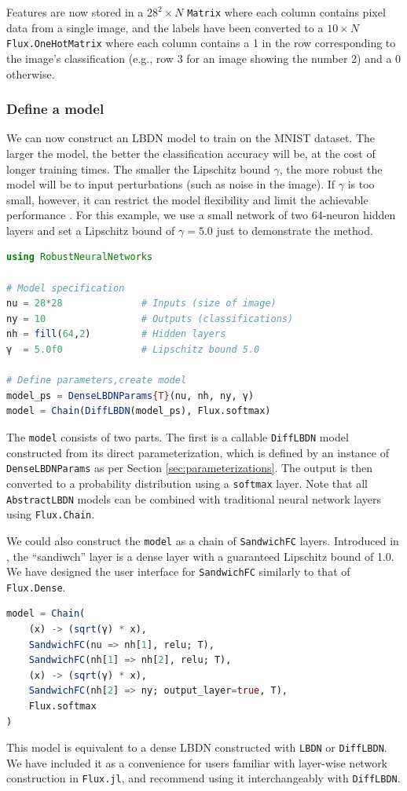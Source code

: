 Features are now stored in a $28^2\times N$ \verb|Matrix| where each column contains pixel data from a single image, and the labels have been converted to a $10\times N$ \verb|Flux.OneHotMatrix| where each column contains a 1 in the row corresponding to the image's classification (e.g., row 3 for an image showing the number 2) and a 0 otherwise.

\subsubsection{Define a model} \label{sec:mnist-model}

We can now construct an LBDN model to train on the MNIST dataset. The larger the model, the better the classification accuracy will be, at the cost of longer training times. The smaller the Lipschitz bound $\gamma$, the more robust the model will be to input perturbations (such as noise in the image). If $\gamma$ is too small, however, it can restrict the model flexibility and limit the achievable performance \cite{Wang+Manchester2023}. For this example, we use a small network of two 64-neuron hidden layers and set a Lipschitz bound of $\gamma=5.0$ just to demonstrate the method.

\begin{lstlisting}[language = Julia]
using RobustNeuralNetworks

# Model specification
nu = 28*28              # Inputs (size of image)
ny = 10                 # Outputs (classifications)
nh = fill(64,2)         # Hidden layers 
γ  = 5.0f0              # Lipschitz bound 5.0

# Define parameters,create model
model_ps = DenseLBDNParams{T}(nu, nh, ny, γ)
model = Chain(DiffLBDN(model_ps), Flux.softmax)
\end{lstlisting}

The \verb|model| consists of two parts. The first is a callable \verb|DiffLBDN| model constructed from its direct parameterization, which is defined by an instance of \verb|DenseLBDNParams| as per Section \ref{sec:parameterizations}. The output is then converted to a probability distribution using a \verb|softmax| layer. Note that all \verb|AbstractLBDN| models can be combined with traditional neural network layers using \verb|Flux.Chain|. 

We could also construct the \verb|model| as a chain of \verb|SandwichFC| layers. Introduced in \cite{Wang+Manchester2023}, the ``sandiwch'' layer is a dense layer with a guaranteed Lipschitz bound of 1.0. We have designed the user interface for \verb|SandwichFC| similarly to that of \verb|Flux.Dense|.
\begin{lstlisting}[language = Julia]
model = Chain(
    (x) -> (sqrt(γ) * x),
    SandwichFC(nu => nh[1], relu; T),
    SandwichFC(nh[1] => nh[2], relu; T),
    (x) -> (sqrt(γ) * x),
    SandwichFC(nh[2] => ny; output_layer=true, T),
    Flux.softmax
)
\end{lstlisting}
This model is equivalent to a dense LBDN constructed with \verb|LBDN| or \verb|DiffLBDN|. We have included it as a convenience for users familiar with layer-wise network construction in \verb|Flux.jl|, and recommend using it interchangeably with \verb|DiffLBDN|.

